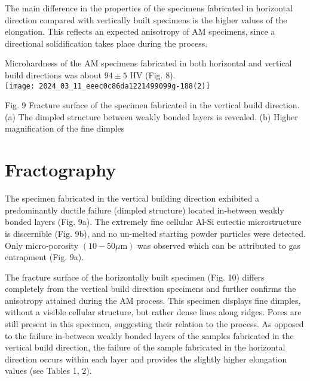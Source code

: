 \documentclass[10pt]{article}
\begin{document}
The main difference in the properties of the specimens fabricated in horizontal direction compared with vertically built specimens is the higher values of the elongation. This reflects an expected anisotropy of AM specimens, since a directional solidification takes place during the process.

Microhardness of the AM specimens fabricated in both horizontal and vertical build directions was about $94 \pm 5$ HV (Fig. 8).\\
\texttt{[image: 2024\_03\_11\_eeec0c86da1221499099g-188(2)]}

Fig. 9 Fracture surface of the specimen fabricated in the vertical build direction. (a) The dimpled structure between weakly bonded layers is revealed. (b) Higher magnification of the fine dimples

\section*{Fractography}
The specimen fabricated in the vertical building direction exhibited a predominantly ductile failure (dimpled structure) located in-between weakly bonded layers (Fig. 9a). The extremely fine cellular Al-Si eutectic microstructure is discernible (Fig. 9b), and no un-melted starting powder particles were detected. Only micro-porosity $(10-50 \mu \mathrm{m})$ was observed which can be attributed to gas entrapment (Fig. 9a).

The fracture surface of the horizontally built specimen (Fig. 10) differs completely from the vertical build direction specimens and further confirms the anisotropy attained during the AM process. This specimen displays fine dimples, without a visible cellular structure, but rather dense lines along ridges. Pores are still present in this specimen, suggesting their relation to the process. As opposed to the failure in-between weakly bonded layers of the samples fabricated in the vertical build direction, the failure of the sample fabricated in the horizontal direction occurs within each layer and provides the slightly higher elongation values (see Tables 1, 2).
\end{document}
